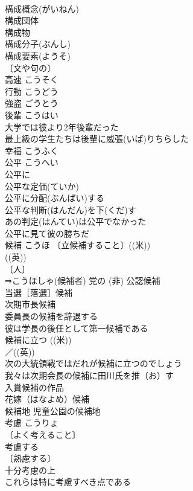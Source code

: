 \documentclass[8pt]{extreport}
\begin{document}
\begin{CJK}{UTF8}{min}
\\	構成概念(がいねん) 
\\	構成団体 
\\	構成物 
\\	構成分子(ぶんし) 
\\	構成要素(ようそ) 
\\	〔文や句の〕
\\	高速	こうそく	
\\	行動	こうどう	
\\	強盗	ごうとう	
\\	後輩	こうはい	
\\	大学では彼より2年後輩だった 
\\	最上級の学生たちは後輩に威張(いば)りちらした 
\\	幸福	こうふく	
\\	公平	こうへい	
\\	公平に 
\\	公平な定価(ていか) 
\\	公平に分配(ぶんぱい)する 
\\	公平な判断(はんだん)を下(くだ)す 
\\	あの判定(はんてい)は公平でなかった 
\\	公平に見て彼の勝ちだ 
\\	候補	こうほ	〔立候補すること〕((米)) 
\\	((英)) 
\\	〔人〕
\\	⇒こうほしゃ(候補者) 党の (非) 公認候補 
\\	当選［落選］候補 
\\	次期市長候補 
\\	委員長の候補を辞退する 
\\	彼は学長の後任として第一候補である 
\\	候補に立つ ((米)) 
\\	／((英)) 
\\	次の大統領戦ではだれが候補に立つのでしょう 
\\	我々は次期会長の候補に田川氏を推（お）す 
\\	入賞候補の作品 
\\	花嫁（はなよめ）候補 
\\	候補地 児童公園の候補地 
\\	考慮	こうりょ	
\\	〔よく考えること〕
\\	考慮する 
\\	〔熟慮する〕
\\	十分考慮の上 
\\	これらは特に考慮すべき点である 

\end{CJK}
\end{document}
